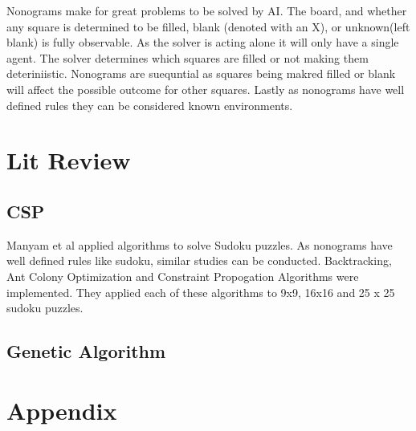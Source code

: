 \documentclass[12pt, a4paper]{article}
\begin{document}
Nonograms make for great problems to be solved by AI. The board, and whether any square is determined to be filled, blank (denoted with an X), or unknown(left blank) is fully observable. As the solver is acting alone it will only have a single agent. The solver determines which squares are filled or not making them deteriniistic. Nonograms are suequntial as squares being makred filled or blank will affect the possible outcome for other squares. Lastly as nonograms have well defined rules they can be considered known environments.


\section{Lit Review}
\subsection{CSP}
Manyam et al \cite{10863160} applied algorithms to solve Sudoku puzzles. As nonograms have well defined rules like sudoku, similar studies can be conducted. Backtracking, Ant Colony Optimization and Constraint Propogation Algorithms were implemented. They applied each of these algorithms to 9x9, 16x16 and 25 x 25 sudoku puzzles. 
\subsection{Genetic Algorithm}

\newpage

\renewcommand{\thesubsection}{\Alph{subsection}}
\setcounter{page}{\value{lastroman}}
\section*{Appendix}


\newpage


\newpage
\listoffigures
\listoftables




\end{document}
